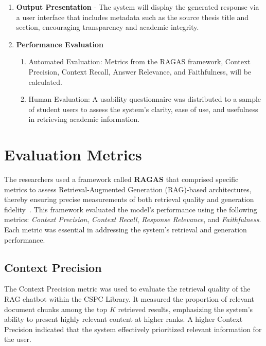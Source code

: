 \begin{refsection}
\begin{enumerate}
    \item \textbf{Output Presentation} - The system will display the generated response via a user interface that includes metadata such as the source thesis title and section, encouraging transparency and academic integrity.

    \item \textbf{Performance Evaluation}
        \begin{enumerate}
            \item [(a)] {Automated Evaluation:} Metrics from the RAGAS framework, Context Precision, Context Recall, Answer Relevance, and Faithfulness, will be calculated.
            \item [(b)] {Human Evaluation:} A usability questionnaire was distributed to a sample of student users to assess the system’s clarity, ease of use, and usefulness in retrieving academic information.
        \end{enumerate}

\end{enumerate}


\section{Evaluation Metrics}

The researchers used a framework called \textbf{RAGAS} that comprised specific metrics to assess Retrieval-Augmented Generation (RAG)-based architectures, thereby ensuring precise measurements of both retrieval quality and generation fidelity~\cite{oubah2024advanced}. This framework evaluated the model's performance using the following metrics: \textit{Context Precision}, \textit{Context Recall}, \textit{Response Relevance}, and \textit{Faithfulness}. Each metric was essential in addressing the system’s retrieval and generation performance.

\subsection*{Context Precision}

The Context Precision metric was used to evaluate the retrieval quality of the RAG chatbot within the CSPC Library. It measured the proportion of relevant document chunks among the top $K$ retrieved results, emphasizing the system's ability to present highly relevant content at higher ranks. A higher Context Precision indicated that the system effectively prioritized relevant information for the user.


\end{refsection}
